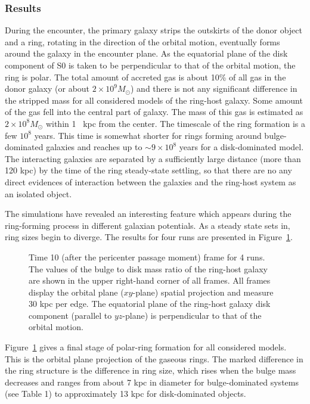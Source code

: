 \subsubsection{Results}

During the encounter, the primary galaxy strips the outskirts 
of the donor object and a ring, rotating in the direction of the 
orbital motion, eventually forms around the galaxy in the encounter 
plane. As the equatorial plane of the disk component of S0 is taken to 
be perpendicular to that of the orbital motion, the ring is polar. 
The total amount of accreted gas is about 10\% of all gas in the
donor galaxy (or about $2\times10^{9} M_{\odot}$) 
and there is not any significant difference in the stripped mass 
for all considered models of the ring-host galaxy. 
Some amount of the gas fell into the central part of galaxy. 
The mass of 
this gas is estimated as $2\times10^8 M_{\odot}$ within 1~ kpc from 
the center. The timescale of 
the ring formation is a few $10^8$ years. This time is somewhat shorter 
for rings forming around bulge-dominated galaxies and reaches up to 
$\sim 9 \times 10^8$ years for a disk-dominated model. The interacting
galaxies are separated by a sufficiently large distance (more than 
120 kpc) by the time of the ring steady-state settling, so that there are 
no any direct evidences of interaction between the galaxies and 
the ring-host system as an isolated object. 

The simulations have revealed an interesting feature which appears 
during the ring-forming process in different galaxian 
potentials. As a steady state sets in, ring sizes begin to diverge.
The results for four runs are presented 
in Figure~\ref{Frings}.  

\begin{figure}
\picplace{0.8cm}
\caption{Time 10 (after the pericenter passage moment) frame for 4 runs. 
The values of the bulge to disk mass ratio of the ring-host galaxy are 
shown in the upper right-hand corner of all frames. All frames display 
the orbital plane ($xy$-plane) spatial projection and measure 30 kpc 
per edge. The equatorial plane of the ring-host galaxy disk component 
(parallel to $yz$-plane) is perpendicular to that of the orbital motion.} 
\label{Frings}
\end{figure}   

Figure~\ref{Frings} gives a final stage of polar-ring formation for 
all considered models. This is the orbital plane projection of the 
gaseous rings. The marked difference in the ring structure is 
the difference in ring size, which rises when the 
bulge mass decreases and ranges from about 7 kpc in diameter 
for bulge-dominated systems (see Table 1) 
to approximately 13 kpc for disk-dominated 
objects.


